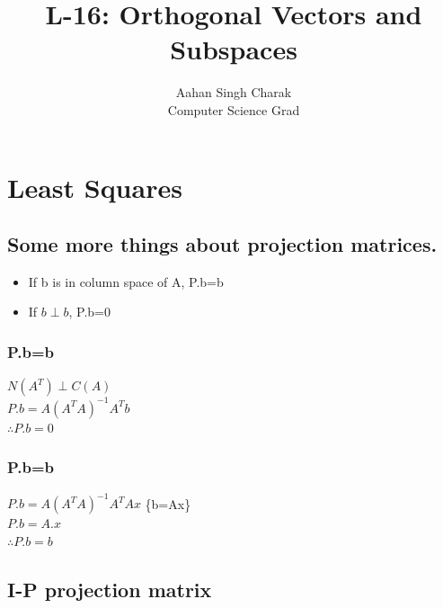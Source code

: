 \documentclass[]{article}
\title{L-16: Orthogonal Vectors and Subspaces}
\author{Aahan Singh Charak\\Computer Science Grad}
\begin{document}
\maketitle
\section{Least Squares}
\vspace{10pt}
\subsection{Some more things about projection matrices.}
\vspace{10pt}

\begin{itemize}
	\item If b is in column space of A, P.b=b
	\item If $b\perp b$, P.b=0
\end{itemize}

\vspace{10pt}

\subsubsection{P.b=b}
\vspace{10pt}

$N(A^T)\perp C(A)$\\

\noindent
$P.b=A{(A^TA)}^{-1}A^Tb$\\

\noindent
$\therefore P.b=0$

\vspace{10pt}

\subsubsection{P.b=b}
\vspace{10pt}

$P.b=A{(A^TA)}^{-1}A^TAx$ \{b=Ax\}\\

\noindent
$P.b=A.x$\\

\noindent
$\therefore P.b=b$\\
	
	
\subsection{I-P projection matrix}
\end{document}
